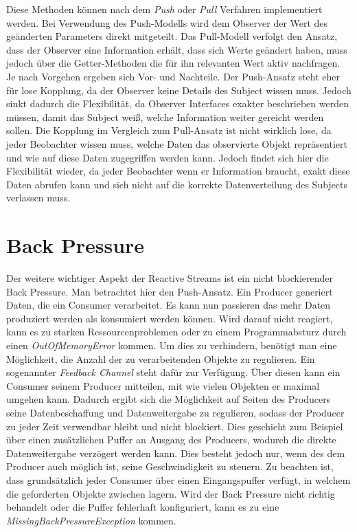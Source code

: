 Diese Methoden können nach dem \textit{Push} oder \textit{Pull} Verfahren implementiert werden. Bei Verwendung des Push-Modells wird dem Observer der Wert des geänderten Parameters direkt mitgeteilt. Das Pull-Modell verfolgt den Ansatz, dass der Observer eine Information erhält, dass sich Werte geändert haben, muss jedoch über die Getter-Methoden die für ihn relevanten Wert aktiv nachfragen. Je nach Vorgehen ergeben sich Vor- und Nachteile. Der Push-Ansatz steht eher für lose Kopplung, da der Observer keine Details des Subject wissen muss. Jedoch sinkt dadurch die Flexibilität, da Observer Interfaces exakter beschrieben werden müssen, damit das Subject weiß, welche Information weiter gereicht werden sollen. Die Kopplung im Vergleich zum Pull-Ansatz ist nicht wirklich lose, da jeder Beobachter wissen muss, welche Daten das observierte Objekt repräsentiert und wie auf diese Daten zugegriffen werden kann. Jedoch findet sich hier die Flexibilität wieder, da jeder Beobachter wenn er Information braucht, exakt diese Daten abrufen kann und sich nicht auf die korrekte Datenverteilung des Subjects verlassen muss.
\section{Back Pressure}
Der weitere wichtiger Aspekt der Reactive Streams ist ein nicht blockierender Back Pressure. Man betrachtet hier den Push-Ansatz. Ein Producer generiert Daten, die ein Consumer verarbeitet. Es kann nun passieren das mehr Daten produziert werden als konsumiert werden können. Wird darauf nicht reagiert, kann es zu starken Ressourcenproblemen oder zu einem Programmabsturz durch einen \textit{OutOfMemoryError} kommen. Um dies zu verhindern, benötigt man eine Möglichkeit, die Anzahl der zu verarbeitenden Objekte zu regulieren. Ein sogenannter \textit{Feedback Channel} steht dafür zur Verfügung. Über diesen kann ein Consumer seinem Producer mitteilen, mit wie vielen Objekten er maximal umgehen kann. Dadurch ergibt sich die Möglichkeit auf Seiten des Producers seine Datenbeschaffung und Datenweitergabe zu regulieren, sodass der Producer zu jeder Zeit verwendbar bleibt und nicht blockiert. Dies geschieht zum Beispiel über einen zusätzlichen Puffer an Ausgang des Producers, wodurch die direkte Datenweitergabe verzögert werden kann. Dies besteht jedoch nur, wenn des dem Producer auch möglich ist, seine Geschwindigkeit zu steuern. Zu beachten ist, dass grundsätzlich jeder Consumer über einen Eingangspuffer verfügt, in welchem die geforderten Objekte zwischen lagern. Wird der Back Pressure nicht richtig behandelt oder die Puffer fehlerhaft konfiguriert, kann es zu eine \textit{MissingBackPressureException} kommen.
